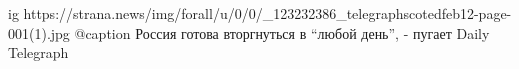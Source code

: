  
 
 
 
 

\ifcmt
  ig https://strana.news/img/forall/u/0/0/_123232386_telegraphscotedfeb12-page-001(1).jpg
	@caption Россия готова вторгнуться в \enquote{любой день}, - пугает Daily Telegraph 
\fi
